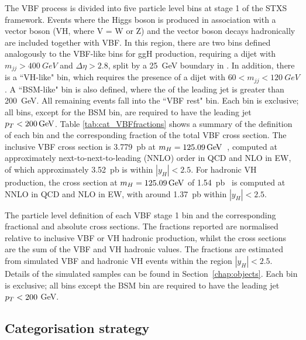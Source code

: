 The VBF process is divided into five particle level bins at stage 1 of the STXS framework.
Events where the Higgs boson is produced in association with a vector boson (VH, where V = W or Z) 
and the vector boson decays hadronically are included together with VBF.
In this region, there are two bins defined analogously to the VBF-like bins for ggH production, 
requiring a dijet with $m_{jj} > \SI{400}{GeV}$ and $\Delta\eta > 2.8$, 
split by a \SI{25}{GeV} boundary in \ptHjj.
In addition, there is a ``VH-like" bin, 
which requires the presence of a dijet with $60 < m_{jj} < \SI{120}{GeV}$. 
A ``BSM-like" bin is also defined, where the \pt of the leading jet is greater than \SI{200}{GeV}.
All remaining events fall into the ``VBF rest" bin.
Each bin is exclusive; all bins, except for the BSM bin, 
are required to have the leading jet $p_T < \SI{200}{GeV}$.
Table \ref{tab:cat_VBFfractions} shows a summary of the definition of each bin 
and the corresponding fraction of the total VBF cross section.
The inclusive VBF cross section is \SI{3.779}{pb} at $m_{H} = \SI{125.09}{GeV}$~\cite{YR4},
computed at approximately next-to-next-to-leading (NNLO) order in QCD and NLO in EW,
of which approximately \SI{3.52}{pb} is within $|y_H| < 2.5$.
For hadronic VH production, 
the cross section at $m_{H} = \SI{125.09}{GeV}$ of \SI{1.54}{pb}~\cite{YR4}
is computed at NNLO in QCD and NLO in EW, 
with around \SI{1.37}{pb} within $|y_H| < 2.5$.

\begin{table}
  \begin{centering}
    
    \caption{The particle level definition of each VBF stage 1 bin 
    and the corresponding fractional and absolute cross sections.
    The fractions reported are normalised relative to inclusive VBF or VH hadronic production, 
    whilst the cross sections are the sum of the VBF and VH hadronic values.
    The fractions are estimated from simulated VBF and hadronic VH \Hgg events 
    within the region $|y_H| < 2.5$.
    Details of the simulated samples can be found in Section~\ref{chap:objects}.
    Each bin is exclusive; all bins except the BSM bin 
    are required to have the leading jet $p_T < 200$ GeV.
    }
    \label{tab:cat_VBFfractions}
  \end{centering}
\end{table}

\subsection{Categorisation strategy}

